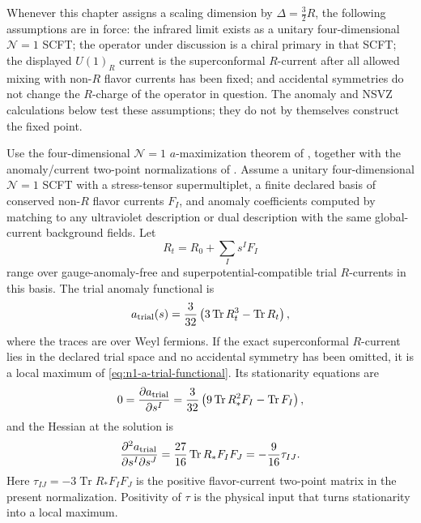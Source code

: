 \begin{hypothesis}
\label{hyp:n1-scft-bookkeeping-input}
Whenever this chapter assigns a scaling dimension by
\(\Delta=\frac32R\), the following assumptions are in force: the infrared
limit exists as a unitary four-dimensional \(\mathcal N=1\) SCFT; the
operator under discussion is a chiral primary in that SCFT; the displayed
\(U(1)_R\) current is the superconformal \(R\)-current after all allowed
mixing with non-\(R\) flavor currents has been fixed; and accidental
symmetries do not change the \(R\)-charge of the operator in question.  The
anomaly and NSVZ calculations below test these assumptions; they do not by
themselves construct the fixed point.
\end{hypothesis}

\begin{quotedtheorem}
\label{qt:n1-a-maximization-boundary}
Use the four-dimensional \(\mathcal N=1\) \(a\)-maximization theorem of
\cite{IntriligatorWecht2003}, together with the anomaly/current two-point
normalizations of \cite{AnselmiFreedmanGrisaruJohansen1998}.  Assume a
unitary four-dimensional \(\mathcal N=1\) SCFT with a stress-tensor
supermultiplet, a finite declared basis of conserved non-\(R\) flavor currents
\(F_I\), and anomaly coefficients computed by matching to any ultraviolet
description or dual description with the same global-current background
fields.  Let
\[
  R_t=R_0+\sum_I s^I F_I
\]
range over gauge-anomaly-free and superpotential-compatible trial
\(R\)-currents in this basis.  The trial anomaly functional is
\begin{equation}
  a_{\rm trial}(s)
  =
  \frac3{32}
  \left(3\operatorname{Tr}R_t^3-\operatorname{Tr}R_t\right),
  \label{eq:n1-a-trial-functional}
\end{equation}
where the traces are over Weyl fermions.  If the exact superconformal
\(R\)-current lies in the declared trial space and no accidental symmetry has
been omitted, it is a local maximum of
\eqref{eq:n1-a-trial-functional}.  Its stationarity equations are
\begin{equation}
  0=
  \frac{\partial a_{\rm trial}}{\partial s^I}
  =
  \frac3{32}
  \left(9\operatorname{Tr}R_\ast^2F_I-\operatorname{Tr}F_I\right),
  \label{eq:n1-a-max-stationarity}
\end{equation}
and the Hessian at the solution is
\begin{equation}
  \frac{\partial^2 a_{\rm trial}}{\partial s^I\partial s^J}
  =
  \frac{27}{16}\operatorname{Tr}R_\ast F_I F_J
  =
  -\frac9{16}\tau_{IJ}.
  \label{eq:n1-a-max-hessian-current-two-point}
\end{equation}
Here \(\tau_{IJ}=-3\operatorname{Tr}R_\ast F_I F_J\) is the positive
flavor-current two-point matrix in the present normalization.  Positivity of
\(\tau\) is the physical input that turns stationarity into a local maximum.
\end{quotedtheorem}

